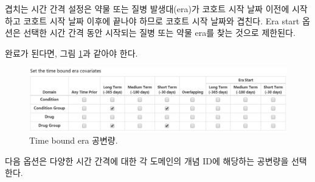 \documentclass[11pt]{book}
\theoremstyle{definition}
\theoremstyle{definition}
\theoremstyle{definition}
\theoremstyle{remark}
\begin{document}
겹치는 시간 간격 설정은 약물 또는 질병 발생대(era)가 코호트 시작 날짜
이전에 시작하고 코호트 시작 날짜 이후에 끝나야 하므로 코호트 시작 날짜와
겹친다. Era start 옵션은 선택한 시간 간격 동안 시작되는 질병 또는 약물
era를 찾는 것으로 제한된다.

완료가 된다면, 그림 \ref{fig:covariateSettings4}과 같아야 한다.

\begin{figure}

{\centering \includegraphics[width=1\linewidth]{images/PatientLevelPrediction/covariateSettings4} 

}

\caption{Time bound era 공변량.}\label{fig:covariateSettings4}
\end{figure}

다음 옵션은 다양한 시간 간격에 대한 각 도메인의 개념 ID에 해당하는
공변량을 선택한다.
\end{document}
